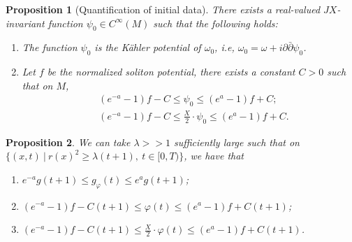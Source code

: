 \documentclass[10pt,a4paper]{amsart}
\newtheorem{prop}{Proposition}
\begin{document}
\begin{prop}[Quantification of initial data]\label{quantification of initial data}
    There exists a real-valued $JX$-invariant function $\psi_0\in C^\infty(M)$ such that the following holds:
    \begin{enumerate}
        \item The function $\psi_0$ is the K\"ahler potential of $\omega_0$, i.e, $\omega_0=\omega+i\partial\bar\partial\psi_0$.
        \item Let $f$ be the normalized soliton potential, there exists a constant $C>0$ such that on $M$,
        \begin{equation*}
            \begin{split}
               & (e^{-a}-1)f-C\le\psi_0\le (e^a-1)f+C;\\
               & (e^{-a}-1)f-C\le\frac{X}{2}\cdot\psi_0\le (e^a-1)f+C.
            \end{split}
        \end{equation*}
    \end{enumerate}
\end{prop}

\begin{prop}\label{rough estimates}
    We can take $\lambda>>1$ sufficiently large such that on $\{(x,t)\ |\ r(x)^2\ge\lambda(t+1),\ t\in[0,T)\}$, we have that
    \begin{enumerate}
        \item $e^{-a}g(t+1)\le g_\varphi(t)\le e^ag(t+1)$;
        \item $(e^{-a}-1)f-C(t+1)\le\varphi(t)\le (e^a-1)f+C(t+1)$;
        \item $(e^{-a}-1)f-C(t+1)\le\frac{X}{2}\cdot\varphi(t)\le (e^a-1)f+C(t+1)$.
    \end{enumerate}
\end{prop}
\end{document}
